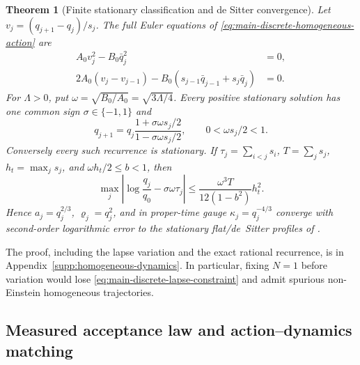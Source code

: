 \documentclass[11pt]{article}
\newtheorem{theorem}{Theorem}[section]
\numberwithin{equation}{section}
\theoremstyle{definition}
\theoremstyle{remark}
\begin{document}
\begin{theorem}[Finite stationary classification and de Sitter convergence]
\label{thm:main-finite-homogeneous-stationarity}
Let $v_j=(q_{j+1}-q_j)/s_j$.  The full Euler equations of
\eqref{eq:main-discrete-homogeneous-action} are
\begin{align}
 A_0v_j^2-B_0\bar q_j^2&=0,\label{eq:main-discrete-lapse-constraint}\\
 2A_0(v_j-v_{j-1})
 -B_0(s_{j-1}\bar q_{j-1}+s_j\bar q_j)&=0.
 \label{eq:main-discrete-scale-euler}
\end{align}
For $\Lambda>0$, put $\omega=\sqrt{B_0/A_0}=\sqrt{3\Lambda/4}$.
Every positive stationary solution has one common sign
$\sigma\in\{-1,1\}$ and
\begin{equation}
 q_{j+1}=q_j
 \frac{1+\sigma\omega s_j/2}{1-\sigma\omega s_j/2},
 \qquad 0<\omega s_j/2<1.
 \label{eq:main-finite-stationary-recurrence}
\end{equation}
Conversely every such recurrence is stationary.  If
$\tau_j=\sum_{i<j}s_i$, $T=\sum_js_j$, $h_t=\max_js_j$, and
$\omega h_t/2\le b<1$, then
\begin{equation}
 \max_j\left|\log\frac{q_j}{q_0}-\sigma\omega\tau_j\right|
 \le \frac{\omega^3T}{12(1-b^2)}h_t^2.
 \label{eq:main-finite-profile-convergence}
\end{equation}
Hence $a_j=q_j^{2/3}$, $\varrho_j=q_j^2$, and in proper-time gauge
$\kappa_j=q_j^{-4/3}$ converge with second-order logarithmic error to the
stationary flat/de~Sitter profiles of
.
\end{theorem}

The proof, including the lapse variation and the exact rational recurrence, is
in Appendix~\ref{supp:homogeneous-dynamics}.  In particular, fixing $N=1$
before variation would lose \eqref{eq:main-discrete-lapse-constraint} and admit
spurious non-Einstein homogeneous trajectories.

\subsection{Measured acceptance law and action--dynamics matching}
\label{subsec:operational-homogeneous-main}
\end{document}

